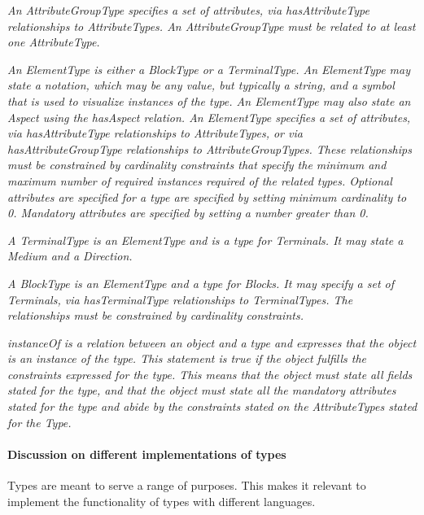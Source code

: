 {\itshape
  An AttributeGroupType specifies a set of attributes, via hasAttributeType relationships to AttributeTypes. An
  AttributeGroupType must be related to at least one AttributeType.}

{\itshape
  An ElementType is either a BlockType or a TerminalType. An ElementType may state a notation, which may be any value,
  but typically a string, and a symbol that is used to visualize instances of the type. An ElementType may also state
  an Aspect using the hasAspect relation. An ElementType specifies a set of attributes, via hasAttributeType
  relationships to AttributeTypes, or via hasAttributeGroupType relationships to AttributeGroupTypes. These
  relationships must be constrained by cardinality constraints that specify the minimum and maximum number of required
  instances required of the related types. Optional attributes are specified for a type are specified by setting
  minimum cardinality to 0. Mandatory attributes are specified by setting a number greater than 0.}

{\itshape
  A TerminalType is an ElementType and is a type for Terminals. It may state a Medium and a Direction.}

{\itshape
  A BlockType is an ElementType and a type for Blocks. It may specify a set of Terminals, via hasTerminalType
  relationships to TerminalTypes. The relationships must be constrained by cardinality constraints.}

\textit{instanceOf is a relation between an object and a type and expresses that the object is an instance of the type. This
  statement is true if the object fulfills the constraints expressed for the type. This means that the object must
  state all fields stated for the type, and that the object must state all the mandatory attributes stated for the type
  and abide by the constraints stated on the AttributeTypes stated for the Type. }



\paragraph{Discussion on different implementations of types}

Types are meant to serve a range of purposes. This makes it relevant to implement the functionality of types with
different languages.

